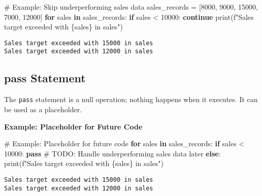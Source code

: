 \documentclass[
  letterpaper,
  DIV=11,
  numbers=noendperiod]{scrreprt}
\newenvironment{Shaded}{\begin{snugshade}}{\end{snugshade}}
\newcommand{\AlertTok}[1]{\textcolor[rgb]{0.68,0.00,0.00}{#1}}
\newcommand{\BuiltInTok}[1]{\textcolor[rgb]{0.00,0.23,0.31}{#1}}
\newcommand{\CommentTok}[1]{\textcolor[rgb]{0.37,0.37,0.37}{#1}}
\newcommand{\ControlFlowTok}[1]{\textcolor[rgb]{0.00,0.23,0.31}{\textbf{#1}}}
\newcommand{\DecValTok}[1]{\textcolor[rgb]{0.68,0.00,0.00}{#1}}
\newcommand{\KeywordTok}[1]{\textcolor[rgb]{0.00,0.23,0.31}{\textbf{#1}}}
\newcommand{\NormalTok}[1]{\textcolor[rgb]{0.00,0.23,0.31}{#1}}
\newcommand{\OperatorTok}[1]{\textcolor[rgb]{0.37,0.37,0.37}{#1}}
\newcommand{\SpecialCharTok}[1]{\textcolor[rgb]{0.37,0.37,0.37}{#1}}
\newcommand{\SpecialStringTok}[1]{\textcolor[rgb]{0.13,0.47,0.30}{#1}}
\begin{document}
\begin{Shaded}
\begin{Highlighting}[]
\CommentTok{\# Example: Skip underperforming sales data}
\NormalTok{sales\_records }\OperatorTok{=}\NormalTok{ [}\DecValTok{8000}\NormalTok{, }\DecValTok{9000}\NormalTok{, }\DecValTok{15000}\NormalTok{, }\DecValTok{7000}\NormalTok{, }\DecValTok{12000}\NormalTok{]}
\ControlFlowTok{for}\NormalTok{ sales }\KeywordTok{in}\NormalTok{ sales\_records:}
    \ControlFlowTok{if}\NormalTok{ sales }\OperatorTok{\textless{}} \DecValTok{10000}\NormalTok{:}
        \ControlFlowTok{continue}
    \BuiltInTok{print}\NormalTok{(}\SpecialStringTok{f"Sales target exceeded with }\SpecialCharTok{\{}\NormalTok{sales}\SpecialCharTok{\}}\SpecialStringTok{ in sales"}\NormalTok{)}
\end{Highlighting}
\end{Shaded}

\begin{verbatim}
Sales target exceeded with 15000 in sales
Sales target exceeded with 12000 in sales
\end{verbatim}

\subsection{pass Statement}\label{pass-statement}

The \texttt{pass} statement is a null operation; nothing happens when it
executes. It can be used as a placeholder.

\textbf{Example: Placeholder for Future Code}

\begin{Shaded}
\begin{Highlighting}[]
\CommentTok{\# Example: Placeholder for future code}
\ControlFlowTok{for}\NormalTok{ sales }\KeywordTok{in}\NormalTok{ sales\_records:}
    \ControlFlowTok{if}\NormalTok{ sales }\OperatorTok{\textless{}} \DecValTok{10000}\NormalTok{:}
        \ControlFlowTok{pass}  \CommentTok{\# }\AlertTok{TODO}\CommentTok{: Handle underperforming sales data later}
    \ControlFlowTok{else}\NormalTok{:}
        \BuiltInTok{print}\NormalTok{(}\SpecialStringTok{f"Sales target exceeded with }\SpecialCharTok{\{}\NormalTok{sales}\SpecialCharTok{\}}\SpecialStringTok{ in sales"}\NormalTok{)}
\end{Highlighting}
\end{Shaded}

\begin{verbatim}
Sales target exceeded with 15000 in sales
Sales target exceeded with 12000 in sales
\end{verbatim}
\end{document}
